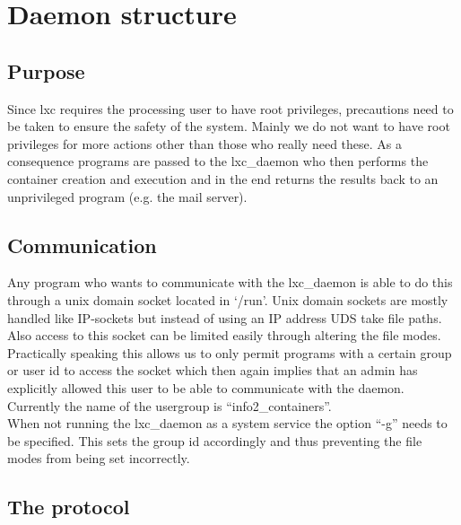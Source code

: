 \chapter{Daemon structure}

\section{Purpose}

Since lxc requires the processing user to have root privileges, precautions need to be taken to ensure
the safety of the system. Mainly we do not want to have root privileges for more actions other than those who really
need these. As a consequence programs are passed to the lxc\_daemon who then performs the container creation
and execution and in the end returns the results back to an unprivileged program (e.g. the mail server).

\section{Communication}

Any program who wants to communicate with the lxc\_daemon is able to do this through a unix domain socket located
in `/run'. Unix domain sockets are mostly handled like IP-sockets but instead of using an IP address UDS take file paths.
Also access to this socket can be limited easily through altering the file modes.
Practically speaking this allows us to only permit programs with a certain group or user id to access the socket which then again
implies that an admin has explicitly allowed this user to be able to communicate with the daemon.\\
Currently the name of the usergroup is ``info2\_containers''.\\
When not running the lxc\_daemon as a system service the option ``-g'' needs to be specified. This sets the group id
accordingly and thus preventing the file modes from being set incorrectly.

\section{The protocol}

